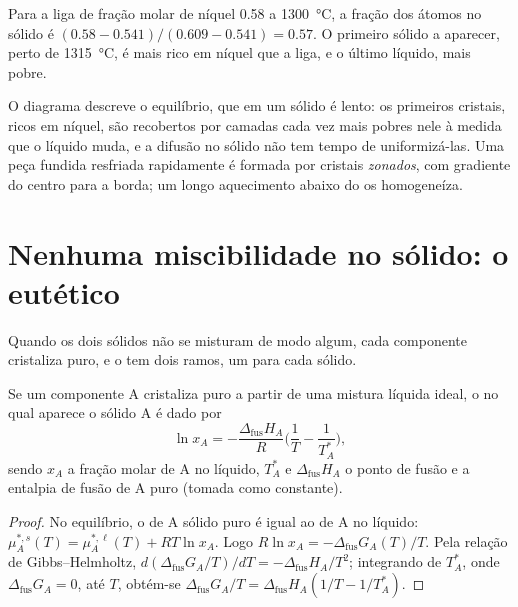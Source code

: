 \begin{example}\label{ex:b2:solid-liquid-diagrams:lever}
Para a liga de fração molar de níquel 0.58 a \qty{1300}{\degreeCelsius}, a
fração dos átomos no sólido é $(0.58 - 0.541)/(0.609 - 0.541) = 0.57$.
O primeiro sólido a aparecer, perto de \qty{1315}{\degreeCelsius}, é mais rico
em níquel que a liga, e o último líquido, mais pobre.
\end{example}

O diagrama descreve o equilíbrio, que em um sólido é lento: os primeiros
cristais, ricos em níquel, são recobertos por camadas cada vez mais pobres
nele à medida que o líquido muda, e a difusão no sólido não tem tempo de
uniformizá-las. Uma peça fundida resfriada rapidamente é formada por cristais
\textit{zonados}, com gradiente do centro para a borda; um longo aquecimento
abaixo do  os homogeneíza.

\section{Nenhuma miscibilidade no sólido: o eutético}

Quando os dois sólidos não se misturam de modo algum, cada componente
cristaliza puro, e o  tem dois ramos, um para cada sólido.

\begin{theorem}\label{thm:b2:solid-liquid-diagrams:schroder}
Se um componente A cristaliza puro a partir de uma mistura líquida ideal, o
 no qual aparece o sólido A é dado por
\[
  \ln x_A = -\frac{\Delta_{\text{fus}}H_A}{R}\Big(\frac1T - \frac1{T_A^*}\Big),
\]
sendo $x_A$ a fração molar de A no líquido, $T_A^*$ e
$\Delta_{\text{fus}}H_A$ o ponto de fusão e a entalpia de fusão de A puro
(tomada como constante).
\end{theorem}

\begin{proof}
No equilíbrio, o  de A sólido puro é igual ao de A no
líquido: $\mu_A^{*,s}(T) = \mu_A^{*,\ell}(T) + RT\ln x_A$. Logo $R\ln x_A =
-\Delta_{\text{fus}}G_A(T)/T$. Pela relação de Gibbs--Helmholtz, $d(\Delta_{\text{fus}}G_A/T)/
dT = -\Delta_{\text{fus}}H_A/T^2$; integrando de $T_A^*$, onde
$\Delta_{\text{fus}}G_A = 0$, até $T$, obtém-se $\Delta_{\text{fus}}G_A/T =
\Delta_{\text{fus}}H_A(1/T - 1/T_A^*)$.
\end{proof}

